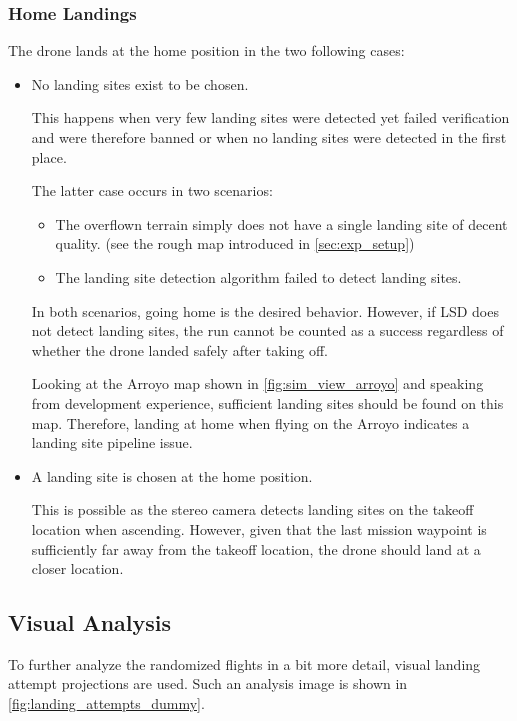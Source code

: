 \subsubsection{Home Landings}
The drone lands at the home position in the two following cases:
\begin{itemize}
    \item No landing sites exist to be chosen.

    This happens when very few landing sites were detected yet failed verification and were therefore banned or when no landing sites were detected in the first place. 

    The latter case occurs in two scenarios: 
    \begin{itemize}
        \item The overflown terrain simply does not have a single landing site of decent quality. (see the rough map introduced in \cref{sec:exp_setup})
        \item The landing site detection algorithm failed to detect landing sites.
    \end{itemize}
    In both scenarios, going home is the desired behavior. However, if LSD does not detect landing sites, the run cannot be counted as a success regardless of whether the drone landed safely after taking off.

    Looking at the Arroyo map shown in \cref{fig:sim_view_arroyo} and speaking from development experience, sufficient landing sites should be found on this map. Therefore, landing at home when flying on the Arroyo indicates a landing site pipeline issue.
    \item A landing site is chosen at the home position.

    This is possible as the stereo camera detects landing sites on the takeoff location when ascending. However, given that the last mission waypoint is sufficiently far away from the takeoff location, the drone should land at a closer location. 
\end{itemize}


\subsection{Visual Analysis}
To further analyze the randomized flights in a bit more detail, visual landing attempt projections are used. Such an analysis image is shown in \cref{fig:landing_attempts_dummy}.

